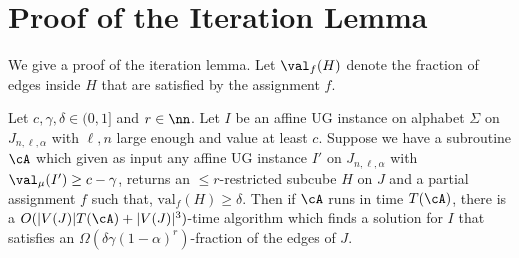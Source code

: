 \section{Proof of the Iteration Lemma}\label{sec:pf_it}
We give a proof of the iteration lemma. Let $\val_f(H)$ denote the fraction of edges inside $H$ that are satisfied by the assignment $f$.

\begin{lemma}\label{lem:subroutine-restated}
Let $c,\gamma,\delta \in (0,1]$ and $r \in \nn$. Let $I$ be an affine UG instance on alphabet $\Sigma$ on $J_{n,\ell,\alpha}$ with $\ell, n$ large enough  and value at least $c$. 
Suppose we have a subroutine $\cA$ which given as input any affine UG instance $I'$ on $J_{n,\ell,\alpha}$ with $\val_\mu(I') \ge c-\gamma$, returns an $\leq r$-restricted subcube $H$ on $J$ and a partial assignment $f$ such that, $\text{val}_{f}(H) \geq \delta$.
Then if $\cA$ runs in time $T(\cA)$, there is a $O(|V(J)|T(\cA)+|V(J)|^3)$-time algorithm which finds a solution for $I$ that satisfies an $\Omega(\delta\gamma(1-\alpha)^r)$-fraction of the  edges of $J$. 
\end{lemma}

